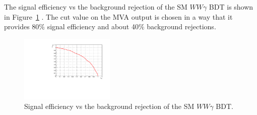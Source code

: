 The signal efficiency vs the background rejection of the SM $WW\gamma$ BDT is shown in Figure~\ref{fig:rocSMmu} . The cut value on the MVA output is chosen in a 
way that it provides 80$\%$ signal efficiency and about 40$\%$ background rejections.

\begin{figure}[]
  \begin{center}
    \includegraphics[width=0.4\textwidth]{figs/rocSM.pdf}
    \caption{ Signal efficiency vs the background rejection of the SM $WW\gamma$ BDT. }
    \label{fig:rocSMmu}
  \end{center}
\end{figure}

